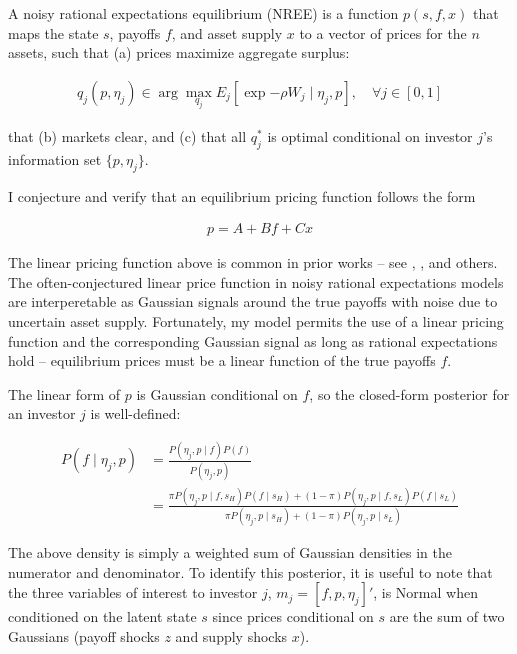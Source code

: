 \documentclass{article}
\begin{document}
\begin{definition}
    A noisy rational expectations equilibrium (NREE) is a function $p(s, f, x)$ that maps the state $s$, payoffs $f$, and asset supply $x$ to a vector of prices for the $n$ assets, such that (a) prices maximize aggregate surplus:

    \begin{align}
        q_j(p, \eta_j) \in \arg\max_{q_j} E_j [\exp{-\rho W_j} \mid \eta_j, p], \quad \forall j \in [0,1]
    \end{align}

    \noindent that (b) markets clear, and (c) that all $q_j^*$ is optimal conditional on investor $j$'s information set $\{p, \eta_j\}$.

\end{definition}

I conjecture and verify that an equilibrium pricing function follows the form

\begin{align}
    p = A + B f + C x
\end{align}

\noindent The linear pricing function above is common in prior works -- see \textcite{kacperczyk_rational_2016}, \textcite{admati_noisy_1985}, and others. The often-conjectured linear price function in noisy rational expectations models are interperetable as Gaussian signals around the true payoffs with noise due to uncertain asset supply. Fortunately, my model permits the use of a linear pricing function and the corresponding Gaussian signal as long as rational expectations hold -- equilibrium prices must be a linear function of the true payoffs $f$. 

The linear form of $p$ is Gaussian conditional on $f$, so the closed-form posterior for an investor $j$ is well-defined:

\begin{align*}
    P(f \mid \eta_j, p) &= \frac{P(\eta_j, p \mid f) P(f)}{P(\eta_j, p)} \\
    &= \frac{\pi P(\eta_j, p \mid f, s_H) P(f \mid s_H) + (1-\pi)P(\eta_j, p \mid f, s_L) P(f \mid s_L)}{
        \pi P(\eta_j, p \mid s_H) + (1-\pi) P(\eta_j, p \mid s_L)
    }
\end{align*}

\noindent The above density is simply a weighted sum of Gaussian densities in the numerator and denominator. To identify this posterior, it is useful to note that the three variables of interest to investor $j$, $m_j = [f, p, \eta_j]'$, is Normal when conditioned on the latent state $s$ since prices conditional on $s$ are the sum of two Gaussians (payoff shocks $z$ and supply shocks $x$). 
\end{document}
